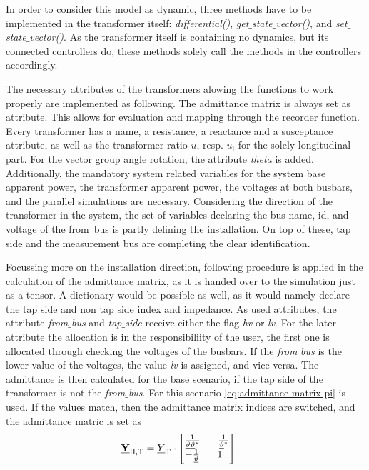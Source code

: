 In order to consider this model as dynamic, three methods have to be implemented in the transformer itself: \textit{differential()}, \textit{get$\_$state$\_$vector()}, and \textit{set$\_$state$\_$vector()}.
As the transformer itself is containing no dynamics, but its connected controllers do, these methods solely call the methods in the controllers accordingly.

The necessary attributes of the transformers alowing the functions to work properly are implemented as following.
The admittance matrix is always set as attribute.
This allows for evaluation and mapping through the recorder function.
Every transformer has a name, a resistance, a reactance and a susceptance attribute, as well as the transformer ratio $u$, resp. $u_\mathrm{l}$ for the solely longitudinal part.
For the vector group angle rotation, the attribute \textit{theta} is added.
Additionally, the mandatory system related variables for the system base apparent power, the transformer apparent power, the voltages at both busbars, and the parallel simulations are necessary.
Considering the direction of the transformer in the system, the set of variables declaring the bus name, id, and voltage of the \glqq from\grqq~bus is partly defining the installation.
On top of these, tap side and the measurement bus are completing the clear identification.

Focussing more on the installation direction, following procedure is applied in the calculation of the admittance matrix, as it is handed over to the simulation just as a tensor.
A dictionary would be possible as well, as it would namely declare the tap side and non tap side index and impedance.
As used attributes, the attribute \textit{from$\_$bus} and \textit{tap$\_$side} receive either the flag \textit{hv} or \textit{lv}.
For the later attribute the allocation is in the responsibiliity of the user, the first one is allocated through checking the voltages of the busbars.
If the \textit{from$\_$bus} is the lower value of the voltages, the value \textit{lv} is assigned, and vice versa.
The admittance is then calculated for the base scenario, if the tap side of the transformer is not the \textit{from$\_$bus}.
For this scenario \autoref{eq:admittance-matrix-pi} is used.
If the values match, then the admittance matrix indices are switched, and the admittance matric is set as
\begin{align}
        \underline{\mathrm{\textbf{Y}}}_\mathrm{\Pi,T}&=\underline{Y}_\mathrm{T} \cdot
        \begin{bmatrix}
                \frac{1}{\underline{\vartheta}\underline{\vartheta}^*} & -\frac{1}{\underline{\vartheta}^*} \\
                -\frac{1}{\underline{\vartheta}} & 1
        \end{bmatrix}. \notag
\end{align}

